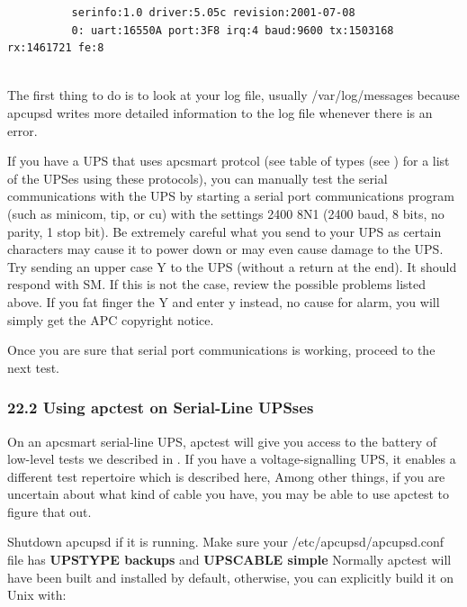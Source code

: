 {{{{{{{{{{\begin{itemize}
\begin{verbatim}
          serinfo:1.0 driver:5.05c revision:2001-07-08
          0: uart:16550A port:3F8 irq:4 baud:9600 tx:1503168 rx:1461721 fe:8
     
\end{verbatim}
\normalsize

\end{itemize}

The first thing to do is to look at your log file, usually /var/log/messages
because apcupsd writes more detailed information to the log file whenever
there is an error.  

If you have a UPS that uses apcsmart protcol (see table of types (see 
) for a list of the UPSes using
these protocols), you can manually test the serial communications with the UPS
by starting a serial port communications program (such as minicom, tip, or cu)
with the settings 2400 8N1 (2400 baud, 8 bits, no parity, 1 stop bit). Be
extremely careful what you send to your UPS as certain characters may cause it
to power down or may even cause damage to the UPS. Try sending an upper case Y
to the UPS (without a return at the end). It should respond with SM. If this
is not the case, review the possible problems listed above. If you fat finger
the Y and enter y instead, no cause for alarm, you will simply get the APC
copyright notice.  

Once you are sure that serial port communications is working, proceed to the
next test. 

\label{Using-apctest-on-Serial_002dLine-UPSses}

\subsubsection*{22.2 Using apctest on Serial-Line UPSses}

\label{index-apctest-222}
\label{index-Testing_002c-with-apctest-223}
On an apcsmart serial-line UPS, apctest will give you access to the battery of
low-level tests we described in 
.  If you have a voltage-signalling UPS, it
enables a different test repertoire which is described here, Among other
things, if you are uncertain about what kind of cable you have, you may be
able to use apctest to figure that out.  

Shutdown apcupsd if it is running. Make sure your /etc/apcupsd/apcupsd.conf
file has {\bf UPSTYPE backups} and {\bf UPSCABLE simple} Normally apctest will
have been built and installed by default, otherwise, you can explicitly build
it on Unix with: 

}}}}}}}}}}
